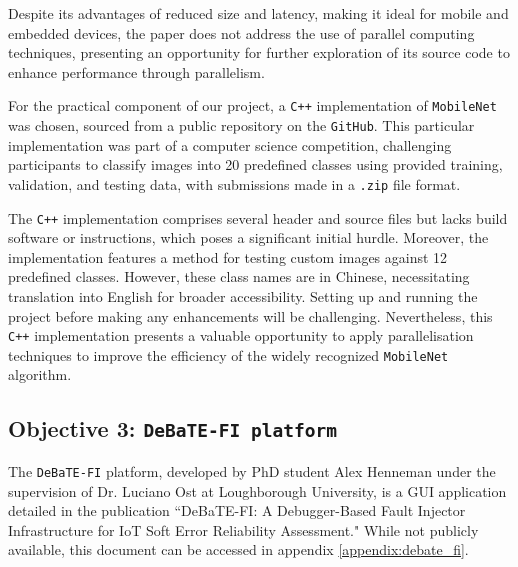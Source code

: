 Despite its advantages of reduced size and latency, making it ideal for mobile and embedded devices, the paper\cite{mobilenet_paper} does not address the use of parallel computing techniques, presenting an opportunity for further exploration of its source code to enhance performance through parallelism.

For the practical component of our project, a \texttt{C++} implementation of \texttt{MobileNet} was chosen, sourced from a public repository on the \texttt{GitHub}\cite{mobilenet_repo}. This particular implementation was part of a computer science competition\cite{mobilenet_competition}, challenging participants to classify images into 20 predefined classes using provided training, validation, and testing data, with submissions made in a \texttt{.zip} file format.

The \texttt{C++} implementation comprises several header and source files but lacks build software or instructions, which poses a significant initial hurdle. Moreover, the implementation features a method for testing custom images against 12 predefined classes. However, these class names are in Chinese, necessitating translation into English for broader accessibility. Setting up and running the project before making any enhancements will be challenging. Nevertheless, this \texttt{C++} implementation presents a valuable opportunity to apply parallelisation techniques to improve the efficiency of the widely recognized \texttt{MobileNet} algorithm.

\subsection{Objective 3: \texttt{DeBaTE-FI platform}}

The \texttt{DeBaTE-FI} platform, developed by PhD student Alex Henneman under the supervision of Dr. Luciano Ost at Loughborough University, is a GUI application detailed in the publication ``DeBaTE-FI: A Debugger-Based Fault Injector Infrastructure for IoT Soft Error Reliability Assessment." While not publicly available, this document can be accessed in appendix \ref{appendix:debate_fi}.

